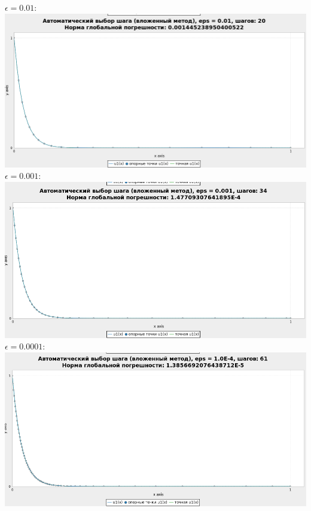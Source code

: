 \documentclass[a4paper,12pt]{article}
\begin{document}
\begin{flushleft}
\begin{enumerate}
      $\epsilon = 0.01:$\linebreak\linebreak\includegraphics{exp_eps_0_01.png}\linebreak\linebreak
      $\epsilon = 0.001:$\linebreak\linebreak\includegraphics{exp_eps_0_001.png}\linebreak\linebreak
      $\epsilon = 0.0001:$\linebreak\linebreak\includegraphics{exp_eps_0_0001.png}\linebreak\linebreak

\end{enumerate}
\end{flushleft}
\end{document}
